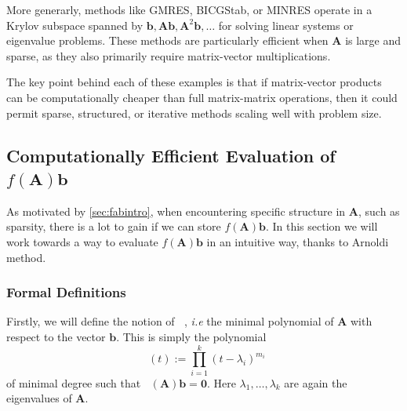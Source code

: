 \documentclass[11pt]{article}
\DeclareMathOperator{\phiAb}{\phi_{\mathbf{A},\mathbf{b}}}
\numberwithin{equation}{section}
\begin{document}
More generarly, methods like GMRES, BICGStab, or MINRES operate in a Krylov subspace spanned by ${\mathbf{b}, \mathbf{A}\mathbf{b}, \mathbf{A}^2\mathbf{b}, \ldots}$ for solving linear systems or eigenvalue problems. These methods are particularly efficient when $\mathbf{A}$ is large and sparse, as they also primarily require matrix-vector multiplications.

The key point behind each of these examples is that if matrix-vector products can be computationally cheaper than full matrix-matrix operations, then it could permit sparse, structured, or iterative methods scaling well with problem size.

\subsection{Computationally Efficient Evaluation of $f(\mathbf{A})\mathbf{b}$}
As motivated by \ref{sec:fabintro}, when encountering specific structure in $\mathbf{A}$, such as sparsity, there is a lot to gain if we can store $f(\mathbf{A})\mathbf{b}$. In this section we will work towards a way to evaluate $f(\mathbf{A})\mathbf{b}$ in an intuitive way, thanks to Arnoldi method.

\subsubsection{Formal Definitions}
Firstly, we will define the notion of $\phiAb$, \textit{i.e} the minimal polynomial of $\mathbf{A}$ with respect to the vector $\mathbf{b}$. This is simply the polynomial
\begin{equation}\label{eq:minPolyAb}
\phiAb(t):= \prod_{i=1}^{k}(t-\lambda_i)^{m_i}
\end{equation}
of minimal degree such that $\phiAb(\mathbf{A})\mathbf{b}=\mathbf{0}$. Here $\lambda_1,\ldots,\lambda_k$ are again the eigenvalues of $\mathbf{A}$.
\end{document}
